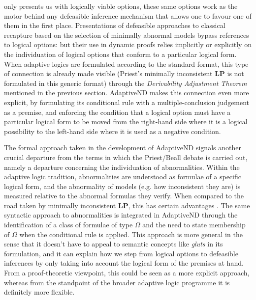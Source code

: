 \documentclass[]{article}
\newtheorem{definition}{Definition}
\newcommand{\TurnADND}[2]
    { {#1}\vdash_{\textbf{\sf AdaptiveND}}  {#2}}
\newcommand{\TurnChecked}[2]
    { {#1}\vdash_{\textbf{\sf \checked}}  {#2}}
\begin{document}
 only presents us with logically viable options, these same options work as the motor behind any defeasible inference mechanism that allows one to favour one of them in the first place. Presentations of defeasible approaches to classical recapture based on the selection of minimally abnormal models bypass references to logical options: but their use in dynamic proofs relies implicitly or explicitly on the individuation of logical options that conform to a particular logical form. When adaptive logics are formulated according to the standard format, this type of connection is already made visible (Priest's minimally inconsistent \textbf{LP} is not formulated in this generic format) through the \emph{Derivability Adjustment Theorem} mentioned in the previous section. \textsf{AdaptiveND} makes this connection even more explicit, by formulating its conditional rule with a multiple-conclusion judgement as a premise, and enforcing the condition that a logical option must have a particular logical form to be moved from the right-hand side where it is a logical possibility to the left-hand side where it is used as a negative condition.

The formal approach taken in the development of \textsf{AdaptiveND} signals another crucial departure from the terms in which the Priest/Beall debate is carried out, namely a departure concerning the individuation of abnormalities. Within the adaptive logic tradition, abnormalities are understood as formulae of a specific logical form, and the abnormality of models (e.g. how inconsistent they are) is measured relative to the abnormal formulas they verify. When compared to the road taken by minimally inconsistent \textbf{LP}, this has certain advantages \cite{Batens:Synthese:2000}. The same syntactic approach to abnormalities is integrated in \textsf{AdaptiveND} through the identification of a class of formulae of type $\Omega$ and the need to state membership of $\Omega$ when the conditional rule is applied. This approach is more general in the sense that it doesn't have to appeal to semantic concepts like \emph{gluts} in its formulation, and it can explain how we step from logical options to defeasible inferences by only taking into account the logical form of the premises at hand. From a proof-theoretic viewpoint, this could be seen as a more explicit approach, whereas from the standpoint of the broader adaptive logic programme it is definitely more flexible.

%
\end{document}
